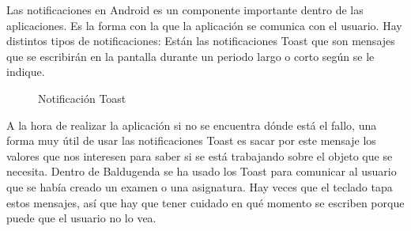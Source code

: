 Las notificaciones en Android es un componente importante dentro de las aplicaciones. Es la forma con la que la aplicación se comunica con el usuario.
Hay distintos tipos de notificaciones:
Están las notificaciones Toast que son mensajes que se escribirán en la pantalla durante un periodo largo o corto según se le indique.
\newpage
\begin{figure}[H] 
  \begin{center} 
    \caption{Notificación Toast} 
    \label{fig:NotificacionToast} 
  \end{center} 
\end{figure}

A la hora de realizar la aplicación si no se encuentra dónde está el fallo, una forma muy útil de usar las notificaciones Toast es sacar por este mensaje los valores que nos interesen para saber si se está trabajando sobre el objeto que se necesita.
Dentro de Baldugenda se ha usado los Toast para comunicar al usuario que se había creado un examen o una asignatura. Hay veces que el teclado tapa estos mensajes, así que hay que tener cuidado en qué momento se escriben porque puede que el usuario no lo vea.

